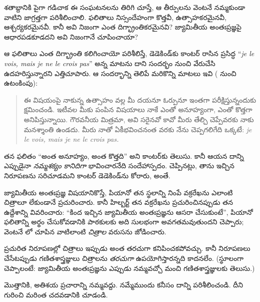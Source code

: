 \documentclass[../../../include/open-logic-section]{subfiles}
\begin{document}


శతాబ్దానికి పైగా గడిచాక ఈ సంఘటనలను తిరిగి చూస్తే, ఆ తీర్పులను వెంటనే నమ్మకుండా వాటిని జాగ్రత్తగా పరిశీలించాలి. ఫలితాలు నిస్సందేహంగా కొత్తవీ, ఉత్సాహకరమైనవీ, ఆశ్చర్యకరమైనవీ. కానీ అవి నిజంగా ఎంత దిగ్భ్రాంతికరమైనవి? జ్యామితీయ అంతఃప్రజ్ఞపై ఆధారపడకూడదని అవి నిజంగానే చూపించాయా?

ఆ ఫలితాలు ఎంత దిగ్భ్రాంతి కలిగించాయో పరిశీలిస్తే, డెడెకిండ్‌కు కాంటర్ రాసిన ప్రసిద్ధ ``\emph{je le vois, mais je ne le crois
pas}'' అన్న మాటను దాని సందర్భం నుంచి వేరుచేసి ఉదహరిస్తున్నారని \citet{Gouvea2011} ఎత్తిచూపారు. ఆ సందర్భాన్ని తెలిపే మరికొన్ని మాటలు ఇవి (\citeauthor{Gouvea2011} నుంచి ఉటంకింపు):
\begin{quote}
ఈ విషయంపై నాకున్న ఉత్సాహం వల్ల మీ దయనూ ఓర్పునూ ఇంతగా పరీక్షిస్తున్నందుకు క్షమించండి. ఇటీవల మీకు పంపిన విషయాలు నాకే ఎంతో అనూహ్యంగా, ఎంతో కొత్తగా అనిపిస్తున్నాయి. గౌరవనీయ మిత్రమా, అవి సరైనవో కావో మీరు తేల్చి చెప్పేవరకు నాకు మనశ్శాంతి ఉండదు. మీరు నాతో ఏకీభవించనంత వరకు నేను చెప్పగలిగేది ఒక్కటే: \emph{je le vois, mais je ne le crois pas.}
\end{quote}
తన ఫలితం ``అంత అనూహ్యం, అంత కొత్తది'' అని కాంటర్‌కు తెలుసు. కానీ ఆయన దాన్ని ఎప్పుడైనా \emph{నమ్మశక్యం కానిదిగా} భావించారనేది సందేహాస్పదం. \citeauthor{Gouvea2011} చెప్పినట్లు, తాను ఇచ్చిన నిరూపణను సరిచూడమని కాంటర్ డెడెకిండ్‌ను కోరారు, అంతే.

జ్యామితీయ అంతఃప్రజ్ఞ విషయానికొస్తే, పియానో తన స్థలాన్ని నింపే వక్రరేఖను ఎలాంటి చిత్రాలూ లేకుండానే ప్రచురించారు. కానీ హిల్బర్ట్ తన వక్రరేఖను ప్రచురించినప్పుడు తన ఉద్దేశాన్ని వివరించారు: ``కింద ఇచ్చిన జ్యామితీయ అంతఃప్రజ్ఞను ఆసరా చేసుకుంటే'', పియానో ఫలితాన్ని అర్థం చేసుకోవడానికి పాఠకులకు అది సులభంగా అవగతమవుతుందని చెప్పారు; వెంటనే లో చూపిన వాటిలాంటి \emph{చిత్రాల} వరుసను జోడించారు.

ప్రచురిత నిరూపణల్లో చిత్రాలు ఇప్పుడు అంత తరచుగా కనిపించకపోవచ్చు. కానీ నిరూపణలు చేసేటప్పుడు గణితశాస్త్రజ్ఞులు చిత్రాలను \emph{తరచుగా} ఉపయోగిస్తారన్నది కాదనలేం. (స్థూలంగా చెప్పాలంటే: జ్యామితీయ అంతఃప్రజ్ఞను ఎప్పుడు నమ్మవచ్చో మంచి గణితశాస్త్రజ్ఞులకు తెలుసు.)

మొత్తానికి, అతిశయ ప్రచారాన్ని నమ్మవద్దు. నమ్మేముందు కనీసం దాన్ని పరిశీలించండి. దీని గురించి మరింత చదవడానికి \citet{Giaquinto2007} చూడండి.
\end{document}
